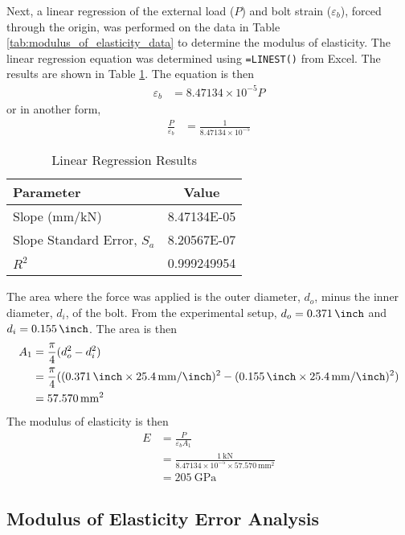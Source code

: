 Next, a linear regression of the external load ($P$) and bolt strain ($\varepsilon_b$), forced through the origin, was performed on the data in Table \ref{tab:modulus_of_elasticity_data} to determine the modulus of elasticity. The linear regression equation was determined using \texttt{=LINEST()} from Excel. The results are shown in Table \ref{tab:modulus_of_elasticity_regression}. The equation is then
\begin{align*}
    \varepsilon_b &= 8.47134 \times 10^{-5} P
\end{align*}
or in another form,
\begin{align*}
    \frac{P}{\varepsilon_b} &= \frac{1}{8.47134 \times 10^{-5}} 
\end{align*}
\begin{table}[h]
    \centering
    \caption{Linear Regression Results}
    \label{tab:modulus_of_elasticity_regression}
    \begin{tabular}{lc}
    \toprule
    Parameter & Value \\
    \midrule
    Slope (mm/kN) & 8.47134E-05 \\
    Slope Standard Error, $S_a$ & 8.20567E-07 \\
    $R^2$ & 0.999249954 \\
    \bottomrule
    \end{tabular}
\end{table}
The area where the force was applied is the outer diameter, $d_o$, minus the inner diameter, $d_i$, of the bolt. From the experimental setup, $d_o = \qty{0.371}{\inch}$ and $d_i = \qty{0.155}{\inch}$. The area is then
\begin{align*}
    A_1 &= \frac{\pi}{4} (d_o^2 - d_i^2) \\
    &= \frac{\pi}{4} ((\qty{0.371}{\inch}\times \qty{25.4}{\milli\meter\per\inch})^2 - (\qty{0.155}{\inch}\times \qty{25.4}{\milli\meter\per\inch})^2) \\
    &= \qty{57.570}{\milli\meter\squared}
\end{align*}
The modulus of elasticity is then
\begin{align*}
    E &= \frac{P}{\varepsilon_b A_1} \\
    &= \frac{\qty{1}{\kilo\newton}}{8.47134 \times 10^{-5} \times \qty{57.570}{\milli\meter\squared}} \\
    &= \boxed{\qty{205}{\giga\pascal}}
\end{align*}   

\subsection{Modulus of Elasticity Error Analysis}
